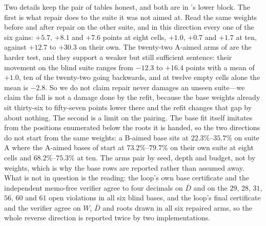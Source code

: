 \documentclass[conference]{IEEEtran}
\begin{document}
Two details keep the pair of tables honest, and both are in 's lower block. The first is what repair does to the suite it was not aimed at. Read the same weights before and after repair on the other suite, and in this direction every one of the six gains: $+5.7$, $+8.1$ and $+7.6$ points at eight cells, $+1.0$, $+0.7$ and $+1.7$ at ten, against $+12.7$ to $+30.3$ on their own. The twenty-two A-aimed arms of  are the harder test, and they support a weaker but still sufficient sentence: their movement on the blind suite ranges from $-12.3$ to $+16.4$ points with a mean of $+1.0$, ten of the twenty-two going backwards, and at twelve empty cells alone the mean is $-2.8$. So we do not claim repair never damages an unseen suite---we claim the fall is not a damage done by the refit, because the base weights already sit thirty-six to fifty-seven points lower there and the refit changes that gap by about nothing. The second is a limit on the pairing. The base fit itself imitates from the positions enumerated below the roots it is handed, so the two directions do not start from the same weights: a B-aimed base sits at $22.3\%$--$35.7\%$ on suite A where the A-aimed bases of  start at $73.2\%$--$79.7\%$ on their own suite at eight cells and $68.2\%$--$75.3\%$ at ten. The arms pair by seed, depth and budget, not by weights, which is why the base rows are reported rather than assumed away. What is not in question is the reading: the loop's own base certificate and the independent memo-free verifier agree to four decimals on $\bar D$ and on the $29$, $28$, $31$, $56$, $60$ and $61$ open violations in all six blind bases, and the loop's final certificate and the verifier agree on $W$, $\bar D$ and roots drawn in all six repaired arms, so the whole reverse direction is reported twice by two implementations.
\end{document}
